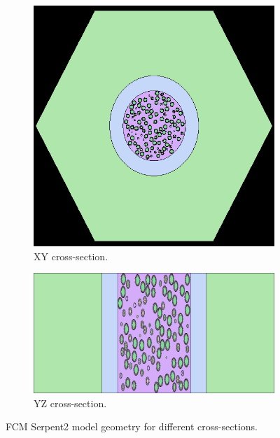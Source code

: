 \documentclass[11pt,letterpaper]{article}
\begin{document}
\begin{figure}[H]
	\centering
	\begin{subfigure}[t]{0.4\textwidth}
		\centering
		\includegraphics[width=\linewidth]{figures/FCM_geom1.png} 
		\caption{XY cross-section.}
		\label{fig:FCM_xy}
	\end{subfigure}
	\vspace{1cm}
	\begin{subfigure}[t]{0.4\textwidth}
		\centering
		\includegraphics[width=\linewidth]{figures/FCM_geom2.png} 
		\caption{YZ cross-section.}
		\label{fig:FCM_yz}
	\end{subfigure}
	\hfill
	\caption{FCM Serpent2 model geometry for different cross-sections.}
	\label{fig:FCM}
\end{figure}
\end{document}

